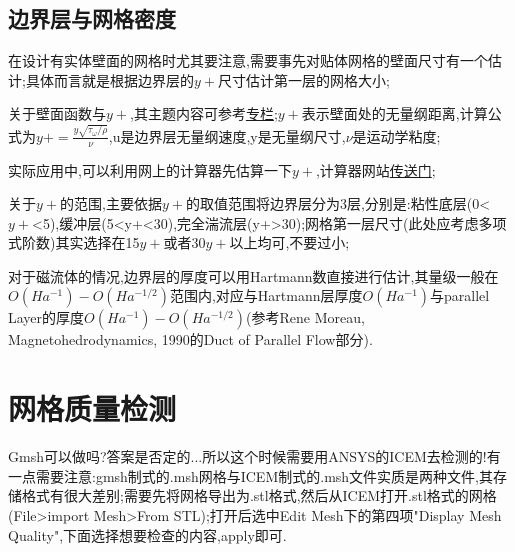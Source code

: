 \subsection{边界层与网格密度}
在设计有实体壁面的网格时尤其要注意,需要事先对贴体网格的壁面尺寸有一个估计;具体而言就是根据边界层的$y+$尺寸估计第一层的网格大小;\par

关于壁面函数与$y+$,其主题内容可参考\href{https://zhuanlan.zhihu.com/p/584913137}{专栏};$y+$表示壁面处的无量纲距离,计算公式为$y+=\frac{y\sqrt{\tau_\omega/\rho}}{\nu}$,u是边界层无量纲速度,y是无量纲尺寸,$\nu$是运动学粘度;\par

实际应用中,可以利用网上的计算器先估算一下$y+$,计算器网站\href{https://www.cfd-online.com/Tools/yplus.php#opennewwidow}{传送门};\par

关于$y+$的范围,主要依据$y+$的取值范围将边界层分为3层,分别是:粘性底层(0<$y+$<5),缓冲层(5<y+<30),完全湍流层(y+>30);网格第一层尺寸(此处应考虑多项式阶数)其实选择在15$y+$或者30$y+$以上均可,不要过小;\par

对于磁流体的情况,边界层的厚度可以用Hartmann数直接进行估计,其量级一般在$O(Ha^{-1})-O(Ha^{-1/2})$范围内,对应与Hartmann层厚度$O(Ha^{-1})$与parallel Layer的厚度$O(Ha^{-1})-O(Ha^{-1/2})$(参考Rene Moreau, Magnetohedrodynamics, 1990的Duct of Parallel Flow部分).


\section{网格质量检测}
Gmsh可以做吗?答案是否定的...所以这个时候需要用ANSYS的ICEM去检测的!有一点需要注意:gmsh制式的.msh网格与ICEM制式的.msh文件实质是两种文件,其存储格式有很大差别;需要先将网格导出为.stl格式,然后从ICEM打开.stl格式的网格(File>import Mesh>From STL);打开后选中Edit Mesh下的第四项"Display Mesh Quality",下面选择想要检查的内容,apply即可.


